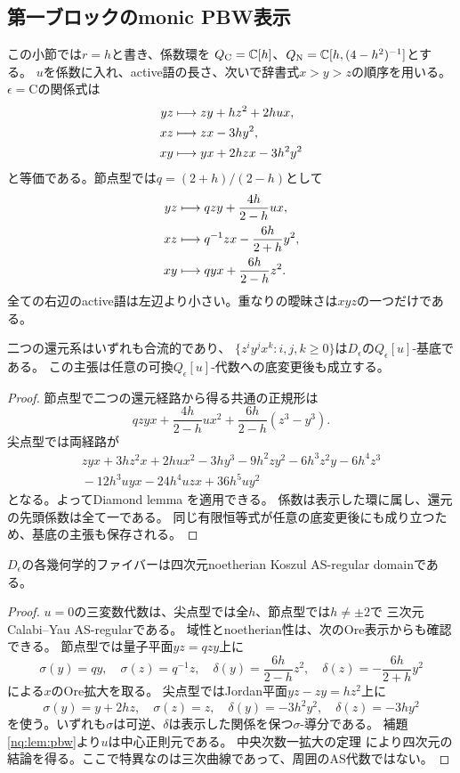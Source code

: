 \subsection{第一ブロックのmonic PBW表示}
この小節では$r=h$と書き、係数環を
$Q_{\mathrm C}=\mathbb C[h]$、$Q_{\mathrm N}=\mathbb C[h,(4-h^2)^{-1}]$とする。
$u$を係数に入れ、active語の長さ、次いで辞書式$x>y>z$の順序を用いる。
$\epsilon=\mathrm C$の関係式は
\begin{align}
 yz&\longmapsto zy+hz^2+2hux,\notag\\
 xz&\longmapsto zx-3hy^2,\notag\\
 xy&\longmapsto yx+2hzx-3h^2y^2
 \label{nq:eq:cusp-rewrite}
\end{align}
と等価である。節点型では$q=(2+h)/(2-h)$として
\begin{align}
 yz&\longmapsto qzy+\frac{4h}{2-h}ux,\notag\\
 xz&\longmapsto q^{-1}zx-\frac{6h}{2+h}y^2,\notag\\
 xy&\longmapsto qyx+\frac{6h}{2-h}z^2.
 \label{nq:eq:node-rewrite}
\end{align}
全ての右辺のactive語は左辺より小さい。重なりの曖昧さは$xyz$の一つだけである。
\begin{lemma}[全次数と任意の底変更に対するPBW性]
\label{nq:lem:pbw}
二つの還元系はいずれも合流的であり、
$\{z^iy^jx^k:i,j,k\ge0\}$は$D_\epsilon$の$Q_\epsilon[u]$-基底である。
この主張は任意の可換$Q_\epsilon[u]$-代数への底変更後も成立する。
\end{lemma}
\begin{proof}
節点型で二つの還元経路から得る共通の正規形は
\[
 qzyx+\frac{4h}{2-h}ux^2+\frac{6h}{2-h}(z^3-y^3).
\]
尖点型では両経路が
\begin{align*}
 zyx+3hz^2x+2hux^2-3hy^3-9h^2zy^2-6h^3z^2y
 -6h^4z^3\\
 {}-12h^3uyx-24h^4uzx+36h^5uy^2
\end{align*}
となる。よってDiamond lemma \cite[Theorem 1.2]{BergNE12}を適用できる。
係数は表示した環に属し、還元の先頭係数は全て一である。
同じ有限恒等式が任意の底変更後にも成り立つため、基底の主張も保存される。
\end{proof}

\begin{lemma}[幾何学的ファイバーの正則性]\label{nq:lem:regular4}
$D_\epsilon$の各幾何学的ファイバーは四次元noetherian Koszul AS-regular domainである。
\end{lemma}
\begin{proof}
$u=0$の三変数代数は、尖点型では全$h$、節点型では$h\ne\pm2$で
三次元Calabi--Yau AS-regularである\cite[Lemma 4.1, Theorem 4.2]{MSNE12}。
域性とnoetherian性は、次のOre表示からも確認できる。
節点型では量子平面$yz=qzy$上に
\[
 \sigma(y)=qy,\quad\sigma(z)=q^{-1}z,\quad
 \delta(y)=\frac{6h}{2-h}z^2,\quad
 \delta(z)=-\frac{6h}{2+h}y^2
\]
による$x$のOre拡大を取る。
尖点型ではJordan平面$yz-zy=hz^2$上に
\[
 \sigma(y)=y+2hz,\quad\sigma(z)=z,\quad
 \delta(y)=-3h^2y^2,\quad\delta(z)=-3hy^2
\]
を使う。いずれも$\sigma$は可逆、$\delta$は表示した関係を保つ$\sigma$-導分である。
補題\ref{nq:lem:pbw}より$u$は中心正則元である。
中央次数一拡大の定理\cite[Theorem 2.6, Corollary 2.7 and Remark 2.8]{LBSVNE12}
により四次元の結論を得る。ここで特異なのは三次曲線であって、周囲のAS代数ではない。
\end{proof}

